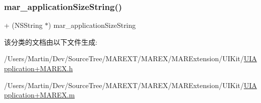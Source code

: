 \subsubsection{\texorpdfstring{mar\+\_\+application\+Size\+String()}{mar\_applicationSizeString()}}
{\footnotesize\ttfamily + (N\+S\+String $\ast$) mar\+\_\+application\+Size\+String \begin{DoxyParamCaption}{ }\end{DoxyParamCaption}}



该分类的文档由以下文件生成\+:\begin{DoxyCompactItemize}
\item 
/\+Users/\+Martin/\+Dev/\+Source\+Tree/\+M\+A\+R\+E\+X\+T/\+M\+A\+R\+E\+X/\+M\+A\+R\+Extension/\+U\+I\+Kit/\hyperlink{_u_i_application_09_m_a_r_e_x_8h}{U\+I\+Application+\+M\+A\+R\+E\+X.\+h}\item 
/\+Users/\+Martin/\+Dev/\+Source\+Tree/\+M\+A\+R\+E\+X\+T/\+M\+A\+R\+E\+X/\+M\+A\+R\+Extension/\+U\+I\+Kit/\hyperlink{_u_i_application_09_m_a_r_e_x_8m}{U\+I\+Application+\+M\+A\+R\+E\+X.\+m}\end{DoxyCompactItemize}
